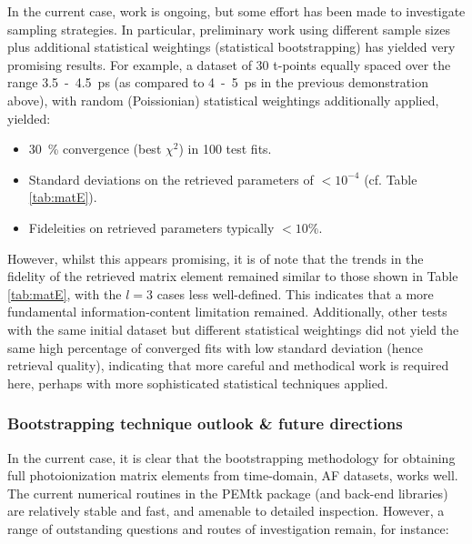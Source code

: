 In the current case, work is ongoing, %
but some effort has been made to investigate sampling strategies. In particular, preliminary work using different sample sizes plus additional statistical weightings (statistical bootstrapping) has yielded very promising results. For example, a dataset of 30 t-points equally spaced over the range 3.5~-~4.5~ps (as compared to 4~-~5~ps in the previous demonstration above), with random (Poissionian) statistical weightings additionally applied, yielded:

\begin{itemize}
\item 30~\% convergence (best $\chi^2$) in 100 test fits.
\item Standard deviations on the retrieved parameters of $<10^{-4}$ (cf. Table \ref{tab:matE}).
\item Fideleities on retrieved parameters typically $<10\%$.
\end{itemize}

However, whilst this appears promising, it is of note that the trends in the fidelity of the retrieved matrix element remained similar to those shown in Table \ref{tab:matE}, with the $l=3$ cases less well-defined. This indicates that a more fundamental information-content limitation remained. Additionally, other tests with the same initial dataset but different statistical weightings did not yield the same high percentage of converged fits with low standard deviation (hence retrieval quality), indicating that more careful and methodical work is required here, perhaps with more sophisticated statistical techniques applied.





\subsubsection{Bootstrapping technique outlook \& future directions}

In the current case, it is clear that the bootstrapping methodology for obtaining full photoionization matrix elements from time-domain, AF datasets, works well. The current numerical routines in the PEMtk package (and back-end libraries) are relatively stable and fast, and amenable to detailed inspection. However, a range of outstanding questions and routes of investigation remain, for instance:

